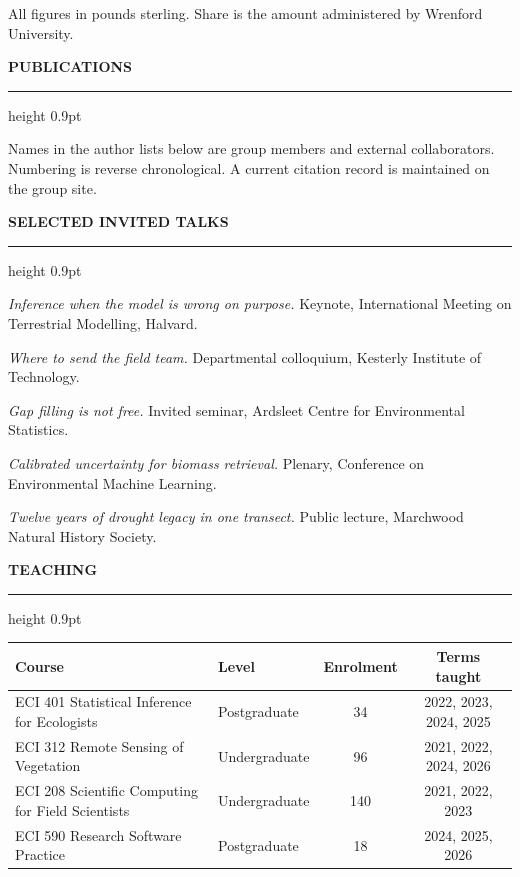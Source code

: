 \documentclass[10pt,a4paper]{article}
\newcommand{\cvsection}[1]{%
  \vspace{10pt}%
  {\normalsize\bfseries\MakeUppercase{#1}}%
  \vspace{2pt}\hrule height 0.9pt%
  \vspace{6pt}%
}
\newenvironment{dated}[1][2.4cm]{%
  \begin{list}{}{%
    \setlength{\labelwidth}{#1}%
    \setlength{\leftmargin}{\dimexpr#1+0.5cm\relax}%
    \setlength{\labelsep}{0.5cm}%
    \setlength{\itemsep}{4pt}%
    \setlength{\parsep}{2pt}%
    \setlength{\topsep}{2pt}%
    \renewcommand{\makelabel}[1]{\small##1\hfill}%
  }%
}{\end{list}}
\begin{document}
\vspace{3pt}
{\small All figures in pounds sterling. Share is the amount administered by Wrenford University.}

\cvsection{Publications}

{\small Names in the author lists below are group members and external collaborators. Numbering is
reverse chronological. A current citation record is maintained on the group site.}

\vspace{4pt}
{\small
\renewcommand{\refname}{}
\vspace{-2.2em}
\setlength{\bibsep}{2.5pt}
\nocite{*}


}

\cvsection{Selected invited talks}

\begin{dated}[2.4cm]
  \item[Jun 2026] \textit{Inference when the model is wrong on purpose.} Keynote, International
    Meeting on Terrestrial Modelling, Halvard.
  \item[Mar 2026] \textit{Where to send the field team.} Departmental colloquium, Kesterly
    Institute of Technology.
  \item[Nov 2025] \textit{Gap filling is not free.} Invited seminar, Ardsleet Centre for
    Environmental Statistics.
  \item[Sep 2024] \textit{Calibrated uncertainty for biomass retrieval.} Plenary, Conference on
    Environmental Machine Learning.
  \item[May 2023] \textit{Twelve years of drought legacy in one transect.} Public lecture,
    Marchwood Natural History Society.
\end{dated}

\cvsection{Teaching}

\begin{center}\small
\begin{tabular}{@{}l l c c@{}}
  \toprule
  Course & Level & Enrolment & Terms taught \\
  \midrule
  ECI 401 Statistical Inference for Ecologists      & Postgraduate  & 34  & 2022, 2023, 2024, 2025 \\
  ECI 312 Remote Sensing of Vegetation              & Undergraduate & 96  & 2021, 2022, 2024, 2026 \\
  ECI 208 Scientific Computing for Field Scientists & Undergraduate & 140 & 2021, 2022, 2023 \\
  ECI 590 Research Software Practice                & Postgraduate  & 18  & 2024, 2025, 2026 \\
  \bottomrule
\end{tabular}
\end{center}
\end{document}
